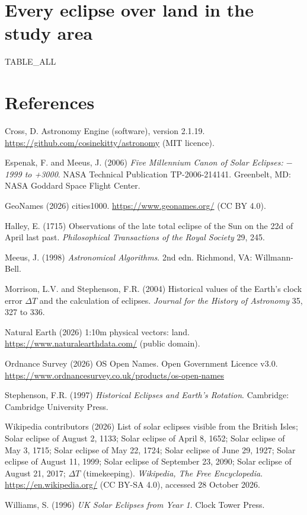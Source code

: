 \documentclass[11pt,a4paper]{article}
\begin{document}
\appendix
\section{Every eclipse over land in the study area}

{{TABLE_ALL}}

\section*{References}

\begin{small}
\setlength{\parindent}{-1.5em}\setlength{\leftskip}{1.5em}

Cross, D. Astronomy Engine (software), version 2.1.19. \url{https://github.com/cosinekitty/astronomy} (MIT licence).

Espenak, F. and Meeus, J. (2006) \textit{Five Millennium Canon of Solar Eclipses: $-$1999 to +3000}. NASA Technical Publication TP-2006-214141. Greenbelt, MD: NASA Goddard Space Flight Center.

GeoNames (2026) cities1000. \url{https://www.geonames.org/} (CC BY 4.0).

Halley, E. (1715) Observations of the late total eclipse of the Sun on the 22d of April last past. \textit{Philosophical Transactions of the Royal Society} 29, 245.

Meeus, J. (1998) \textit{Astronomical Algorithms}. 2nd edn. Richmond, VA: Willmann-Bell.

Morrison, L.V. and Stephenson, F.R. (2004) Historical values of the Earth's clock error $\Delta T$ and the calculation of eclipses. \textit{Journal for the History of Astronomy} 35, 327 to 336.

Natural Earth (2026) 1:10m physical vectors: land. \url{https://www.naturalearthdata.com/} (public domain).

Ordnance Survey (2026) OS Open Names. Open Government Licence v3.0. \url{https://www.ordnancesurvey.co.uk/products/os-open-names}

Stephenson, F.R. (1997) \textit{Historical Eclipses and Earth's Rotation}. Cambridge: Cambridge University Press.

Wikipedia contributors (2026) List of solar eclipses visible from the British Isles; Solar eclipse of August 2, 1133; Solar eclipse of April 8, 1652; Solar eclipse of May 3, 1715; Solar eclipse of May 22, 1724; Solar eclipse of June 29, 1927; Solar eclipse of August 11, 1999; Solar eclipse of September 23, 2090; Solar eclipse of August 21, 2017; $\Delta T$ (timekeeping). \textit{Wikipedia, The Free Encyclopedia}. \url{https://en.wikipedia.org/} (CC BY-SA 4.0), accessed 28 October 2026.

Williams, S. (1996) \textit{UK Solar Eclipses from Year 1}. Clock Tower Press.

\end{small}
\end{document}
